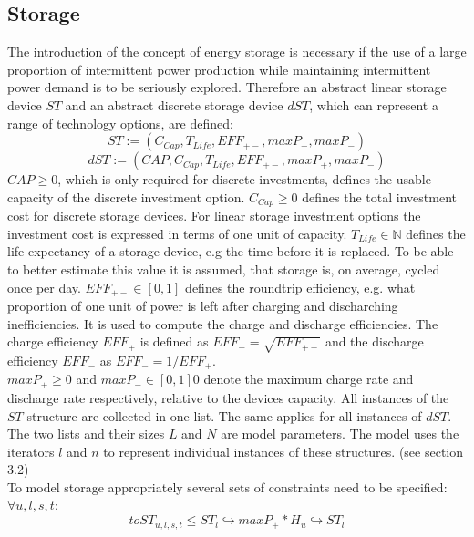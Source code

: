 \documentclass[
	11pt,								%
	DIV10,								%
	a4paper,         					%
	oneside,							%
	headheight=20pt,					%
	footheight=20pt,					%
    parskip=full,						%
    listof=totoc,						%
	bibliography=totoc,					%
	index=totoc,						%
]{scrartcl}
\begin{document}
\subsection{Storage}
The introduction of the concept of energy storage is necessary if the use of a large proportion of intermittent power production while maintaining intermittent power demand is to be seriously explored.
Therefore an abstract linear storage device $ST$ and an abstract discrete storage device $dST$, which can represent a range of technology options, are defined:\\
	\begin{equation}
		ST := (C_{Cap}, T_{Life}, EFF_{+-}, maxP_{+}, maxP_{-})
	\end{equation}
	\begin{equation}
		dST := (CAP, C_{Cap}, T_{Life}, EFF_{+-}, maxP_{+}, maxP_{-})
	\end{equation}
	$CAP \geq 0$, which is only required for discrete investments, defines the usable capacity of the discrete investment option.
	$C_{Cap} \geq 0$ defines the total investment cost for discrete storage devices. For linear storage investment options the investment cost is expressed in terms of one unit of capacity.
	$T_{Life} \in \mathbb{N}$ defines the life expectancy of a storage device, e.g the time before it is replaced. To be able to better estimate this value it is assumed, that storage is, on average, cycled once per day.
	$EFF_{+-} \in [0,1]$ defines the roundtrip efficiency, e.g. what proportion of one unit of power is left after charging and discharching inefficiencies. It is used to compute the charge and discharge efficiencies.
	The charge efficiency $EFF_{+}$ is defined as $EFF_{+} = \sqrt{EFF_{+-}}$ and the discharge efficiency $EFF_{-}$ as $EFF_{-} = 1/EFF_{+}$.\cite{LAUINGER201624}\\
	$maxP_{+} \geq 0$ and $maxP_{-} \in [0,1] 0$ denote the maximum charge rate and discharge rate respectively, relative to the devices capacity.
	All instances of the $ST$ structure are collected in one list. The same applies for all instances of $dST$. The two lists and their sizes $L$ and $N$ are model parameters. The model uses the iterators $l$ and $n$ to represent individual instances of these structures. (see section 3.2)
	\\
	To model storage appropriately several sets of constraints need to be specified:
	\\
	$\forall u,l,s,t $:
	\begin{equation}
		toST_{u,l,s,t} \leq ST_l\hookrightarrow  maxP_{+} * H_u \hookrightarrow ST_l
	\end{equation}
\end{document}
